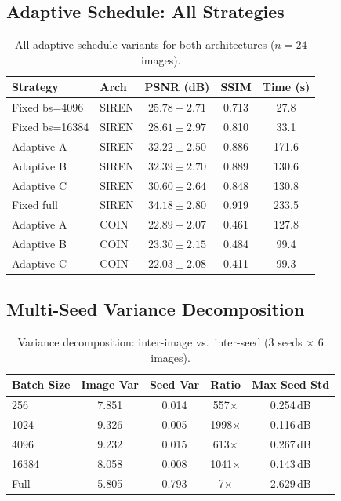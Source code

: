 \documentclass[a4paper,oneside,11pt,english]{scrartcl}
\begin{document}
\subsection{Adaptive Schedule: All Strategies}

\begin{table}[H]
\centering
\caption{All adaptive schedule variants for both architectures
($n=24$ images).}
\label{tab:adaptive_full}
\begin{tabular}{llccc}
\toprule
Strategy & Arch & PSNR (dB) & SSIM & Time (s) \\
\midrule
Fixed bs=4096   & SIREN & $25.78 \pm 2.71$ & 0.713 & 27.8 \\
Fixed bs=16384  & SIREN & $28.61 \pm 2.97$ & 0.810 & 33.1 \\
Adaptive A      & SIREN & $32.22 \pm 2.50$ & 0.886 & 171.6 \\
Adaptive B      & SIREN & $32.39 \pm 2.70$ & 0.889 & 130.6 \\
Adaptive C      & SIREN & $30.60 \pm 2.64$ & 0.848 & 130.8 \\
Fixed full      & SIREN & $34.18 \pm 2.80$ & 0.919 & 233.5 \\
\midrule
Adaptive A      & COIN  & $22.89 \pm 2.07$ & 0.461 & 127.8 \\
Adaptive B      & COIN  & $23.30 \pm 2.15$ & 0.484 & 99.4 \\
Adaptive C      & COIN  & $22.03 \pm 2.08$ & 0.411 & 99.3 \\
\bottomrule
\end{tabular}
\end{table}

\subsection{Multi-Seed Variance Decomposition}

\begin{table}[H]
\centering
\caption{Variance decomposition: inter-image vs.\ inter-seed
(3 seeds $\times$ 6 images).}
\label{tab:seeds_full}
\begin{tabular}{lcccc}
\toprule
Batch Size & Image Var & Seed Var & Ratio & Max Seed Std \\
\midrule
256    & 7.851 & 0.014 & 557$\times$ & 0.254\,dB \\
1024   & 9.326 & 0.005 & 1998$\times$ & 0.116\,dB \\
4096   & 9.232 & 0.015 & 613$\times$ & 0.267\,dB \\
16384  & 8.058 & 0.008 & 1041$\times$ & 0.143\,dB \\
Full   & 5.805 & 0.793 & 7$\times$ & 2.629\,dB \\
\bottomrule
\end{tabular}
\end{table}
\end{document}
